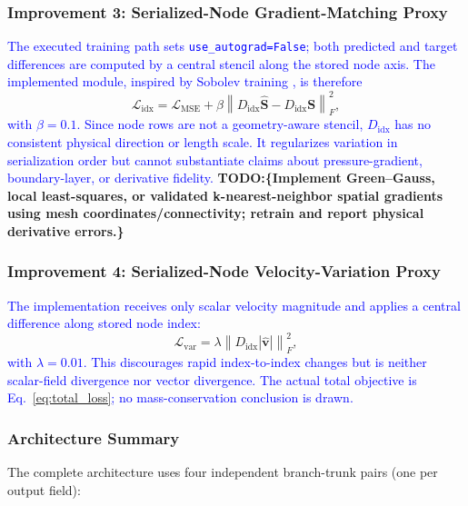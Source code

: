 \documentclass[journal]{IEEEtran}
\newcommand{\added}[1]{\textcolor{blue}{#1}}
\newcommand{\todo}[1]{\textcolor{green!50!black}{\textbf{TODO:\{#1\}}}}
\begin{document}
\subsubsection{Improvement 3: Serialized-Node Gradient-Matching Proxy}
 \added{The executed training path sets \texttt{use\_autograd=False}; both predicted and target differences are computed by a central stencil along the stored node axis. The implemented module, inspired by Sobolev training \cite{son2021sobolev}, is therefore}
{\color{blue}
\begin{equation}
\mathcal{L}_\text{idx} = \mathcal{L}_\text{MSE}
 + \beta\left\|D_\text{idx}\hat{\bm S}-D_\text{idx}\bm S\right\|_F^2,
\label{eq:sobolev}
\end{equation}}
\added{with $\beta=0.1$. Since node rows are not a geometry-aware stencil, $D_\text{idx}$ has no consistent physical direction or length scale. It regularizes variation in serialization order but cannot substantiate claims about pressure-gradient, boundary-layer, or derivative fidelity.} \todo{Implement Green--Gauss, local least-squares, or validated k-nearest-neighbor spatial gradients using mesh coordinates/connectivity; retrain and report physical derivative errors.}

\subsubsection{Improvement 4: Serialized-Node Velocity-Variation Proxy}
 \added{The implementation receives only scalar velocity magnitude and applies a central difference along stored node index:}
{\color{blue}
\begin{equation}
\mathcal{L}_\text{var} = \lambda\left\|D_\text{idx}|\hat{\bm v}|\right\|_F^2,
\label{eq:div}
\end{equation}}
\added{with $\lambda=0.01$. This discourages rapid index-to-index changes but is neither scalar-field divergence nor vector divergence. The actual total objective is Eq.~\eqref{eq:total_loss}; no mass-conservation conclusion is drawn.}

\subsubsection{Architecture Summary}
The complete architecture uses four independent branch-trunk pairs (one per output field):
\end{document}

